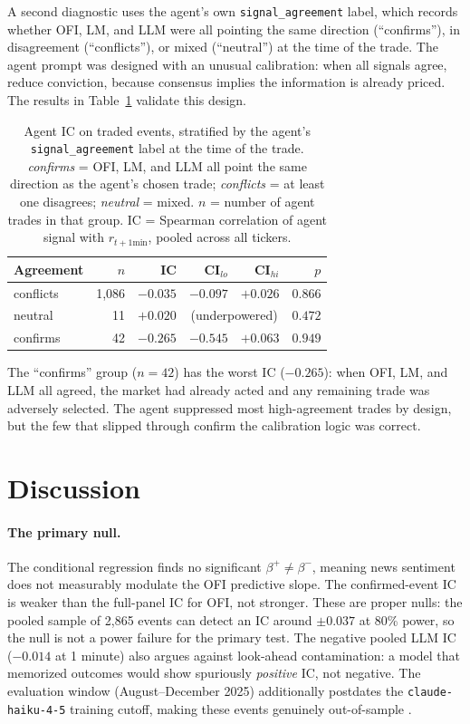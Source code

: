 \documentclass[11pt, letterpaper]{article}
\begin{document}
A second diagnostic uses the agent's own \texttt{signal\_agreement} label, which
records whether OFI, LM, and LLM were all pointing the same direction (``confirms''),
in disagreement (``conflicts''), or mixed (``neutral'') at the time of the trade.
The agent prompt was designed with an unusual calibration: when all signals agree,
reduce conviction, because consensus implies the information is already priced. The
results in Table~\ref{tab:agreement} validate this design.

\begin{table}[h]
\centering
\small
\caption{Agent IC on traded events, stratified by the agent's \texttt{signal\_agreement}
label at the time of the trade. \textit{confirms} = OFI, LM, and LLM all point the
same direction as the agent's chosen trade; \textit{conflicts} = at least one
disagrees; \textit{neutral} = mixed. $n$ = number of agent trades in that group.
IC = Spearman correlation of agent signal with $r_{t+1\text{min}}$, pooled across
all tickers.}
\label{tab:agreement}
\begin{tabular}{lrrrrr}
\toprule
Agreement & $n$ & IC & CI$_{lo}$ & CI$_{hi}$ & $p$ \\
\midrule
conflicts & 1,086 & $-0.035$ & $-0.097$ & $+0.026$ & $0.866$ \\
neutral   &    11 & $+0.020$ & \multicolumn{2}{c}{(underpowered)} & $0.472$ \\
confirms  &    42 & $-0.265$ & $-0.545$ & $+0.063$ & $0.949$ \\
\bottomrule
\end{tabular}
\end{table}

The ``confirms'' group ($n = 42$) has the worst IC ($-0.265$): when OFI, LM, and LLM
all agreed, the market had already acted and any remaining trade was adversely selected.
The agent suppressed most high-agreement trades by design, but the few that slipped
through confirm the calibration logic was correct.

\section{Discussion}
\label{sec:discussion}

\paragraph{The primary null.} The conditional regression finds no significant
$\beta^+ \neq \beta^-$, meaning news sentiment does not measurably modulate the OFI
predictive slope. The confirmed-event IC is weaker than the full-panel IC for OFI,
not stronger. These are proper nulls: the pooled sample of 2,865 events can detect an
IC around $\pm 0.037$ at 80\% power, so the null is not a power failure for the
primary test. The negative pooled LLM IC ($-0.014$ at 1 minute) also argues against
look-ahead contamination: a model that memorized outcomes would show spuriously
\emph{positive} IC, not negative. The evaluation window (August--December 2025)
additionally postdates the \texttt{claude-haiku-4-5} training cutoff, making these
events genuinely out-of-sample \citep{lopezlira2023chatgpt}.
\end{document}
